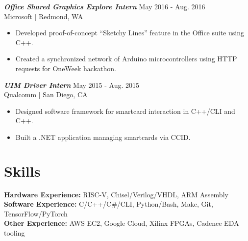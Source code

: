 \documentclass[letter]{res}
\begin{document}
\begin{resume}
%
%
%

{\sl \textbf{Office Shared Graphics Explore Intern}} \hfill May 2016 - Aug. 2016\\
Microsoft | Redmond, WA \newline
 \vspace{-4mm}
  \begin{itemize}
  \item Developed proof-of-concept ``Sketchy Lines'' feature in the Office suite using C++.
  \item Created a synchronized network of Arduino microcontrollers using HTTP requests for OneWeek hackathon.
  \end{itemize}

\vspace{-2mm}

{\sl \textbf{UIM Driver Intern}} \hfill May 2015 - Aug. 2015\\
Qualcomm | San Diego, CA \newline

 \vspace{-4mm}

 \begin{itemize}
 \item Designed software framework for smartcard interaction in C++/CLI and C++.
 \item Built a .NET application managing smartcards via CCID.
 \end{itemize}

\vspace{-4.5mm}

\section{Skills}
\textbf{Hardware Experience:} RISC-V, Chisel/Verilog/VHDL, ARM Assembly\\
\textbf{Software Experience:} C/C++/C\#/CLI, Python/Bash, Make, Git, TensorFlow/PyTorch\\
\textbf{Other Experience:} AWS EC2, Google Cloud, Xilinx FPGAs, Cadence EDA tooling\\


\end{resume}
\end{document}
